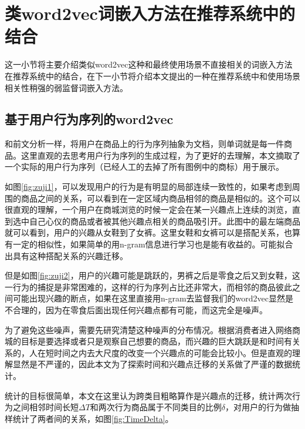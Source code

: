 \section{类word2vec词嵌入方法在推荐系统中的结合}
这一小节将主要介绍类似word2vec这种和最终使用场景不直接相关的词嵌入方法在推荐系统中的结合，在下一小节将介绍本文提出的一种在推荐系统中和使用场景相关性稍强的弱监督词嵌入方法。

\subsection{基于用户行为序列的word2vec}
和前文分析一样，将用户在商品上的行为序列抽象为文档，则单词就是每一件商品。这里直观的去思考用户行为序列的生成过程，为了更好的去理解，本文摘取了一个实际的用户行为序列（已经人工的去掉了所有图例中的商标）用于展示。

如图\ref{fig:zuji1}，可以发现用户的行为是有明显的局部连续一致性的，如果考虑到周围的商品之间的关系，可以看到在一定区域内商品相邻的商品是相似的。这个可以很直观的理解，一个用户在商城浏览的时候一定会在某一兴趣点上连续的浏览，直到选中自己心仪的商品或者被其他兴趣点相关的商品吸引开。此图中的最左端商品就可以看到，用户的兴趣从女鞋到了女裤。这里女鞋和女裤可以是搭配关系，也算有一定的相似性，如果简单的用n-gram信息进行学习也是能有收益的。可能拟合出具有这种搭配关系的兴趣迁移。

但是如图\ref{fig:zuji2}，用户的兴趣可能是跳跃的，男裤之后是零食之后又到女鞋，这一行为的捕捉是非常困难的，这样的行为序列占比还非常大，而相邻的商品彼此之间可能出现兴趣的断点，如果在这里直接用n-gram去监督我们的word2vec显然是不合理的，因为在零食后面出现任何兴趣点都有可能，而这完全是噪声。

为了避免这些噪声，需要先研究清楚这种噪声的分布情况。根据消费者进入网络商城的目标是要选择或者只是观察自己想要的商品，而兴趣的巨大跳跃是和时间有关系的，人在短时间之内去大尺度的改变一个兴趣点的可能会比较小。但是直观的理解显然是不严谨的，因此本文为了探索时间和兴趣点迁移的关系做了严谨的数据统计。

统计的目标很简单，本文在这里认为跨类目粗略算作是兴趣点的迁移，统计两次行为之间相邻时间长短$\Delta T$和两次行为商品属于不同类目的比例$\delta$，对用户的行为做抽样统计了两者间的关系，如图\ref{fig:TimeDelta}。

